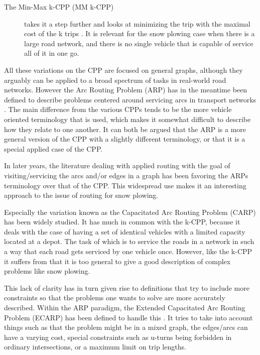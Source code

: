 \begin{description}
\item[The Min-Max k-CPP (MM k-CPP)] takes it a step further and looks at minimizing the trip with the maximal cost of the k trips \citep{frederickson1976MMkCPP}. It is relevant for the snow plowing case when there is a large road network, and there is no single vehicle that is capable of service all of it in one go. 

\end{description}

All these variations on the CPP are focused on general graphs, although they arguably can be applied to a broad spectrum of tasks in real-world road networks. However the Arc Routing Problem (ARP) has in the meantime been defined to describe problems centered around servicing arcs in transport networks \citep{eiselt1995ARP}. The main difference from the various CPPs tends to be the more vehicle oriented terminology that is used, which makes it somewhat difficult to describe how they relate to one another. It can both be argued that the ARP is a more general version of the CPP with a slightly different terminology, or that it is a special applied case of the CPP.

In later years, the literature dealing with applied routing with the goal of visiting/servicing the arcs and/or edges in a graph has been favoring the ARPs terminology over that of the CPP. This widespread use makes it an interesting approach to the issue of routing for snow plowing.

Especially the variation known as the Capacitated Arc Routing Problem (CARP) \citep{ulusoy1985CARP} has been widely studied. It has much in common with the k-CPP, because it deals with the case of having a set of identical vehicles with a limited capacity located at a depot. The task of which is to service the roads in a network in such a way that each road gets serviced by one vehicle once. However, like the k-CPP it suffers from that it is too general to give a good description of complex problems like snow plowing.

This lack of clarity has in turn given rise to definitions that try to include more constraints so that the problems one wants to solve are more accurately described. Within the ARP paradigm, the Extended Capacitated Arc Routing Problem (ECARP) has been defined to handle this \citep{lacomme2004competitiveMA}. It tries to take into account things such as that the problem might be in a mixed graph, the edges/arcs can have a varying cost, special constraints such as u-turns being forbidden in ordinary intersections, or a maximum limit on trip lengths.

